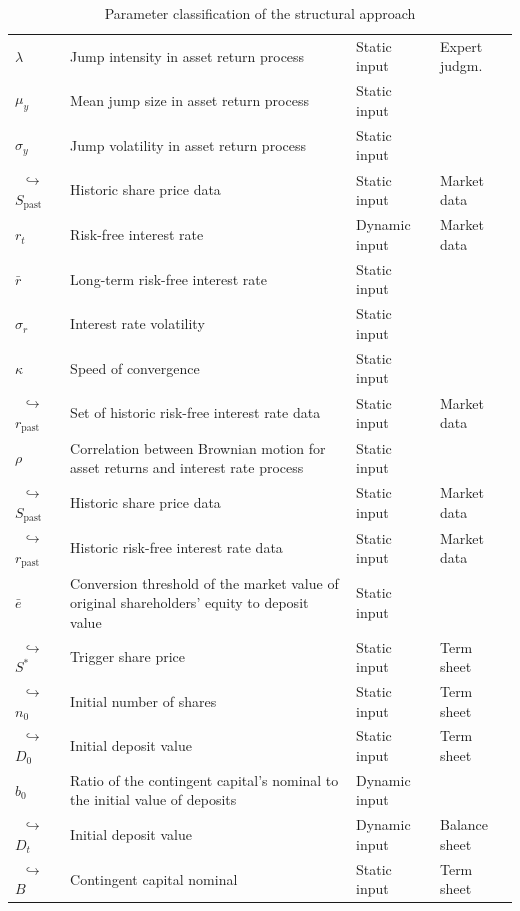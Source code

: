 \begin{table}
\begin{tabular}{p{1.8cm}p{6.8cm}p{2.4cm}p{2.5cm}}
			$\lambda$ & Jump intensity in asset return process & Static input  & Expert judgm.  \\	
			$\mu_y$ & Mean jump size in asset return process & Static input &  \\
			$\sigma_y$ & Jump volatility in asset return process & Static input &  \\
			$\,\,\,$$\hookrightarrow$ $S_\text{past}$ &  Historic share price data & Static input & Market data\\
			$r_t$ & Risk-free interest rate & Dynamic input & Market data \\
			$\bar{r}$ & Long-term risk-free interest rate & Static input & \\
			$\sigma_r$ &Interest rate volatility & Static input & \\
			$\kappa$ & Speed of convergence & Static input & \\
			$\,\,\,$$\hookrightarrow$ $r_\text{past}$ & Set of historic risk-free interest rate data & Static input & Market data\\
			$\rho$ & Correlation between Brownian motion for asset returns and interest rate process  & Static input & \\ 
			$\,\,\,$$\hookrightarrow$ $S_\text{past}$ &  Historic share price data & Static input & Market data\\
			$\,\,\,$$\hookrightarrow$ $r_\text{past}$ &  Historic risk-free interest rate data & Static input & Market data\\
			$\bar{e}$ & Conversion threshold of the market value of original shareholders' equity to deposit value & Static input & \\
			$\,\,\,$$\hookrightarrow$ $S^*$ & Trigger share price & Static input & Term sheet\\
			$\,\,\,$$\hookrightarrow$ $n_0$ & Initial number of shares & Static input & Term sheet\\
			$\,\,\,$$\hookrightarrow$ $D_0$ & Initial deposit value & Static input & Term sheet\\
			$b_0$ & Ratio of the contingent capital's nominal to the initial value of deposits & Dynamic input & \\
			$\,\,\,$$\hookrightarrow$ $D_t$ & Initial deposit value & Dynamic input & Balance sheet \\
			$\,\,\,$$\hookrightarrow$ $B$ & Contingent capital nominal & Static input & Term sheet\\
		\bottomrule
	\end{tabular}
	\caption[Parameter classification of the structural approach]{Parameter classification of the structural approach}
	\label{tbl:structuralapproachdata}
\end{table}

